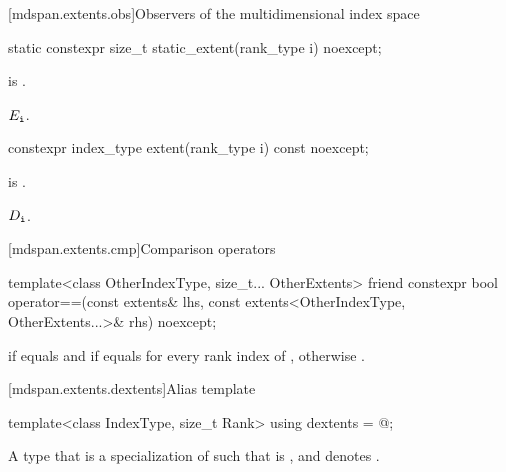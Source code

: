 [mdspan.extents.obs]{Observers of the multidimensional index space}

%
\begin{itemdecl}
static constexpr size_t static_extent(rank_type i) noexcept;
\end{itemdecl}

\begin{itemdescr}
\pnum
\expects
{} is .

\pnum
\returns
$E_{\texttt{i}}$.
\end{itemdescr}

%
\begin{itemdecl}
constexpr index_type extent(rank_type i) const noexcept;
\end{itemdecl}

\begin{itemdescr}
\pnum
\expects
{} is .

\pnum
\returns
$D_{\texttt{i}}$.
\end{itemdescr}

[mdspan.extents.cmp]{Comparison operators}

%
\begin{itemdecl}
template<class OtherIndexType, size_t... OtherExtents>
  friend constexpr bool operator==(const extents& lhs,
                                   const extents<OtherIndexType, OtherExtents...>& rhs) noexcept;
\end{itemdecl}

\begin{itemdescr}
\pnum
\returns
{} if  equals  and
if  equals 
for every rank index  of ,
otherwise .
\end{itemdescr}

[mdspan.extents.dextents]{Alias template }

%
\begin{itemdecl}
template<class IndexType, size_t Rank>
  using dextents = @\seebelow@;
\end{itemdecl}

\begin{itemdescr}
\pnum
\result
A type  that is a specialization of 
such that  is , and
 denotes .
\end{itemdescr}

